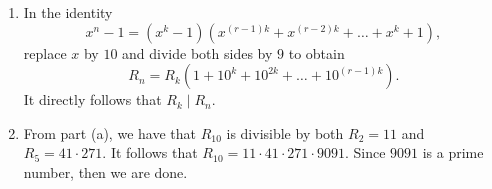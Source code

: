 \begin{solution}
    \begin{enumerate}
        \item In the identity
        $$x^n - 1 = (x^k - 1)(x^{(r-1)k} + x^{(r-2)k} + \dots + x^k + 1),$$
        replace $x$ by $10$ and divide both sides by $9$ to obtain
        $$R_n = R_k (1 + 10^k + 10^{2k} + \dots + 10^{(r-1)k}).$$
        It directly follows that $R_k \mid R_n$.
        \item From part (a), we have that $R_{10}$ is divisible by both $R_2 = 11$ and $R_5 = 41 \cdot 271$. It follows that $R_{10} = 11 \cdot 41 \cdot 271 \cdot 9091$. Since $9091$ is a prime number, then we are done.
    \end{enumerate}
\end{solution}